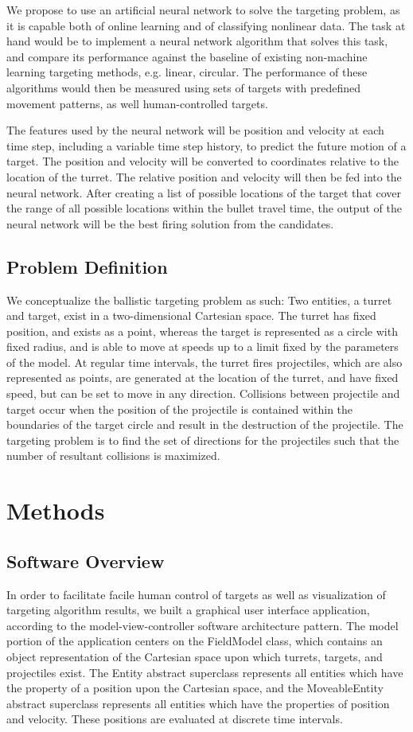 \documentclass[11pt,letterpaper]{article}
\begin{document}
We propose to use an artificial neural network to solve the targeting problem, as it is capable both of online learning and of classifying nonlinear data. The task at hand would be to implement a neural network algorithm that solves this task, and compare its performance against the baseline of existing non-machine learning targeting methods, e.g. linear, circular. The performance of these algorithms would then be measured using sets of targets with predefined movement patterns, as well human-controlled targets.

The features used by the neural network will be position and velocity at each time step, including a variable time step history, to predict the future motion of a target. The position and velocity will be converted to coordinates relative to the location of the turret. The relative position and velocity will then be fed into the neural network. After creating a list of possible locations of the target that cover the range of all possible locations within the bullet travel time, the output of the neural network will be the best firing solution from the candidates.

\subsection{Problem Definition}
We conceptualize the ballistic targeting problem as such:
Two entities, a turret and target, exist in a two-dimensional Cartesian space. The turret has fixed position, and exists as a point, whereas the target is represented as a circle with fixed radius, and is able to move at speeds up to a limit fixed by the parameters of the model. At regular time intervals, the turret fires projectiles, which are also represented as points, are generated at the location of the turret, and have fixed speed, but can be set to move in any direction. Collisions between projectile and target occur when the position of the projectile is contained within the boundaries of the target circle and result in the destruction of the projectile. The targeting problem is to find the set of directions for the projectiles such that the number of resultant collisions is maximized.
\section{Methods}

\subsection{Software Overview}
In order to facilitate facile human control of targets as well as visualization of targeting algorithm results, we built a graphical user interface application, according to the model-view-controller software architecture pattern. The model portion of the application centers on the FieldModel class, which contains an object representation of the Cartesian space upon which turrets, targets, and projectiles exist. The Entity abstract superclass represents all entities which have the property of a position upon the Cartesian space, and the MoveableEntity abstract superclass represents all entities which have the properties of position and velocity. These positions are evaluated at discrete time intervals.
\end{document}
